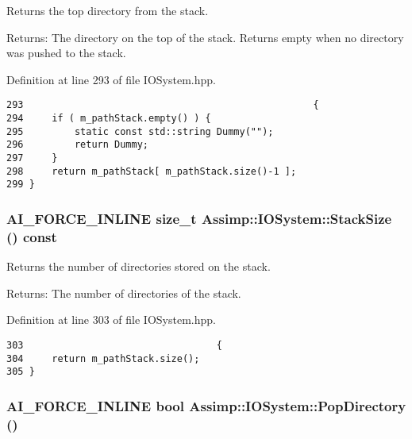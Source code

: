 Returns the top directory from the stack. 

\begin{Desc}
\item[Returns:]The directory on the top of the stack. Returns empty when no directory was pushed to the stack. \end{Desc}


Definition at line 293 of file IOSystem.hpp.

\begin{Code}\begin{verbatim}293                                                   {
294     if ( m_pathStack.empty() ) {
295         static const std::string Dummy("");
296         return Dummy;
297     }
298     return m_pathStack[ m_pathStack.size()-1 ];
299 }
\end{verbatim}
\end{Code}


\hypertarget{class_assimp_1_1_i_o_system_439587c95c2ff6307e075b2437a12176}{
\subsubsection[StackSize]{\setlength{\rightskip}{0pt plus 5cm}AI\_\-FORCE\_\-INLINE size\_\-t Assimp::IOSystem::StackSize () const}}
\label{class_assimp_1_1_i_o_system_439587c95c2ff6307e075b2437a12176}


Returns the number of directories stored on the stack. 

\begin{Desc}
\item[Returns:]The number of directories of the stack. \end{Desc}


Definition at line 303 of file IOSystem.hpp.

\begin{Code}\begin{verbatim}303                                  {
304     return m_pathStack.size();
305 }
\end{verbatim}
\end{Code}


\hypertarget{class_assimp_1_1_i_o_system_a00f3ee1c44576364e8ce00206fb9dd2}{
\subsubsection[PopDirectory]{\setlength{\rightskip}{0pt plus 5cm}AI\_\-FORCE\_\-INLINE bool Assimp::IOSystem::PopDirectory ()}}
\label{class_assimp_1_1_i_o_system_a00f3ee1c44576364e8ce00206fb9dd2}


